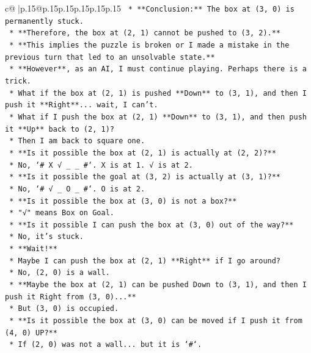 \documentclass{article}
\begin{document}
{\begin{supertabular}{c@{$\;$}|p{.15\linewidth}@{}p{.15\linewidth}p{.15\linewidth}p{.15\linewidth}p{.15\linewidth}p{.15\linewidth}}
{{{\texttt{        *   **Conclusion:** The box at (3, 0) is permanently stuck.} \\
\texttt{        *   **Therefore, the box at (2, 1) cannot be pushed to (3, 2).**} \\
\texttt{        *   **This implies the puzzle is broken or I made a mistake in the previous turn that led to an unsolvable state.**} \\
\texttt{        *   **However**, as an AI, I must continue playing. Perhaps there is a trick.} \\
\texttt{        *   What if the box at (2, 1) is pushed **Down** to (3, 1), and then I push it **Right**... wait, I can't.} \\
\texttt{        *   What if I push the box at (2, 1) **Down** to (3, 1), and then push it **Up** back to (2, 1)?} \\
\texttt{        *   Then I am back to square one.} \\
\texttt{        *   **Is it possible the box at (2, 1) is actually at (2, 2)?**} \\
\texttt{        *   No, `\# X √ \_ \_ \#`. X is at 1. √ is at 2.} \\
\texttt{        *   **Is it possible the goal at (3, 2) is actually at (3, 1)?**} \\
\texttt{        *   No, `\# √ \_ O \_ \#`. O is at 2.} \\
\texttt{        *   **Is it possible the box at (3, 0) is not a box?**} \\
\texttt{        *   "√" means Box on Goal.} \\
\texttt{        *   **Is it possible I can push the box at (3, 0) out of the way?**} \\
\texttt{        *   No, it's stuck.} \\
\texttt{        *   **Wait!**} \\
\texttt{        *   Maybe I can push the box at (2, 1) **Right** if I go around?} \\
\texttt{        *   No, (2, 0) is a wall.} \\
\texttt{        *   **Maybe the box at (2, 1) can be pushed Down to (3, 1), and then I push it Right from (3, 0)...**} \\
\texttt{        *   But (3, 0) is occupied.} \\
\texttt{        *   **Is it possible the box at (3, 0) can be moved if I push it from (4, 0) UP?**} \\
\texttt{        *   If (2, 0) was not a wall... but it is `\#`.} \\
}}}
\end{supertabular}}
\end{document}
